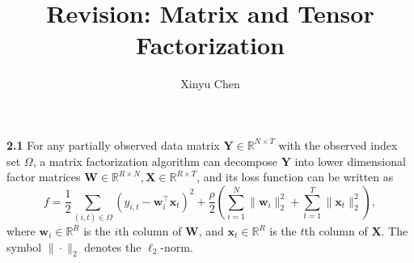 \documentclass[12pt]{article}
\title{Revision: Matrix and Tensor Factorization}
\author{Xinyu Chen}
\begin{document}
\maketitle

\noindent\textbf{2.1} For any partially observed data matrix $\boldsymbol{Y}\in\mathbb{R}^{N\times T}$ with the observed index set $\Omega$, a matrix factorization algorithm can decompose $\boldsymbol{Y}$ into lower dimensional factor matrices $\boldsymbol{W}\in\mathbb{R}^{R\times N},\boldsymbol{X}\in\mathbb{R}^{R\times T}$, and its loss function can be written as
\begin{equation}
f=\frac{1}{2}\sum_{(i,t)\in\Omega}\left(y_{i,t}-\boldsymbol{w}_{i}^{\top}\boldsymbol{x}_{t}\right)^{2}+\frac{\rho}{2}\left(\sum_{i=1}^{N}\|\boldsymbol{w}_{i}\|_{2}^{2}+\sum_{t=1}^{T}\|\boldsymbol{x}_{t}\|_{2}^{2}\right),
\end{equation}
where $\boldsymbol{w}_{i}\in\mathbb{R}^{R}$ is the $i$th column of $\boldsymbol{W}$, and $\boldsymbol{x}_{t}\in\mathbb{R}^{R}$ is the $t$th column of $\boldsymbol{X}$. The symbol $\|\cdot\|_{2}$ denotes the $\ell_2$-norm.
\end{document}
